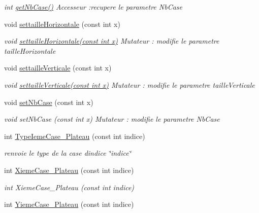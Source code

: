 \begin{DoxyCompactItemize}
\begin{DoxyCompactList}\small\item\em int \hyperlink{classPlateau_aaa97e7e38b3233a2a66d787a57893ea1}{get\+Nb\+Case()} Accesseur \+:recupere le parametre Nb\+Case \end{DoxyCompactList}\item 
void \hyperlink{classPlateau_a6be3818334c871d9adc18dd716e2b21e}{settaille\+Horizontale} (const int x)
\begin{DoxyCompactList}\small\item\em void \hyperlink{classPlateau_a6be3818334c871d9adc18dd716e2b21e}{settaille\+Horizontale(const int x)} Mutateur \+: modifie le parametre taille\+Horizontale \end{DoxyCompactList}\item 
void \hyperlink{classPlateau_a1a3e541307dfe02361517a26a442b74b}{settaille\+Verticale} (const int x)
\begin{DoxyCompactList}\small\item\em void \hyperlink{classPlateau_a1a3e541307dfe02361517a26a442b74b}{settaille\+Verticale(const int x)} Mutateur \+: modifie le parametre taille\+Verticale \end{DoxyCompactList}\item 
void \hyperlink{classPlateau_a6182b4ee7784b182d00e86fb0de9dfe9}{set\+Nb\+Case} (const int x)
\begin{DoxyCompactList}\small\item\em void set\+Nb\+Case (const int x) Mutateur \+: modifie le parametre Nb\+Case \end{DoxyCompactList}\item 
int \hyperlink{classPlateau_ac96fb6f6cd0e74e43d2342ed2344b09e}{Type\+Ieme\+Case\+\_\+\+Plateau} (const int indice)
\begin{DoxyCompactList}\small\item\em renvoie le type de la case d\textquotesingle{}indice \char`\"{}indice\char`\"{} \end{DoxyCompactList}\item 
int \hyperlink{classPlateau_a104d21bb84fcf7d170052118946bf78c}{Xieme\+Case\+\_\+\+Plateau} (const int indice)
\begin{DoxyCompactList}\small\item\em int Xieme\+Case\+\_\+\+Plateau (const int indice) \end{DoxyCompactList}\item 
int \hyperlink{classPlateau_ac99c2bfea8d60469bac93f7b10863475}{Yieme\+Case\+\_\+\+Plateau} (const int indice)

\end{DoxyCompactItemize}

